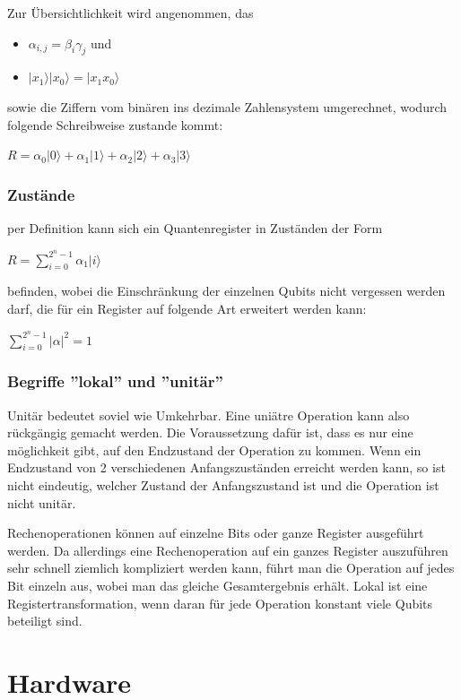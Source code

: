Zur Übersichtlichkeit wird angenommen, das
\begin{itemize}
	\item $\alpha_{i,j} = \beta_i\gamma_j$ und
	\item $|x_1\rangle|x_0\rangle = |x_1 x_0\rangle$
\end{itemize}
sowie die Ziffern vom binären ins dezimale Zahlensystem umgerechnet, wodurch folgende Schreibweise zustande kommt:

$R = \alpha_0|0\rangle+\alpha_1|1\rangle+\alpha_2|2\rangle+\alpha_3|3\rangle$


\subsubsection{Zustände}
\label{sec:Zustaende}

per Definition kann sich ein Quantenregister in Zuständen der Form

$R = \displaystyle\sum_{i=0}^{2^n-1} \alpha_1|i\rangle$

befinden, wobei die Einschränkung der einzelnen Qubits nicht vergessen werden darf, die für ein Register auf folgende Art erweitert werden kann:

$\displaystyle\sum_{i=0}^{2^n-1}  |\alpha|^2 = 1$


\subsubsection{Begriffe ''lokal'' und ''unitär''}
\label{sec:Begriffe lokal unitaer}

Unitär bedeutet soviel wie Umkehrbar. Eine uniätre Operation kann also rückgängig gemacht werden. Die Voraussetzung dafür ist, dass es nur eine möglichkeit gibt, auf den Endzustand der Operation zu kommen. Wenn ein Endzustand von 2 verschiedenen Anfangszuständen erreicht werden kann, so ist nicht eindeutig, welcher Zustand der Anfangszustand ist und die Operation ist nicht unitär.

Rechenoperationen können auf einzelne Bits oder ganze Register ausgeführt werden. Da allerdings eine Rechenoperation auf ein ganzes Register auszuführen sehr schnell ziemlich kompliziert werden kann, führt man die Operation auf jedes Bit einzeln aus, wobei man das gleiche Gesamtergebnis erhält. Lokal ist eine Registertransformation, wenn daran für jede Operation konstant viele Qubits beteiligt sind.

\newpage

\section{Hardware}
\label{sec:hardware}

